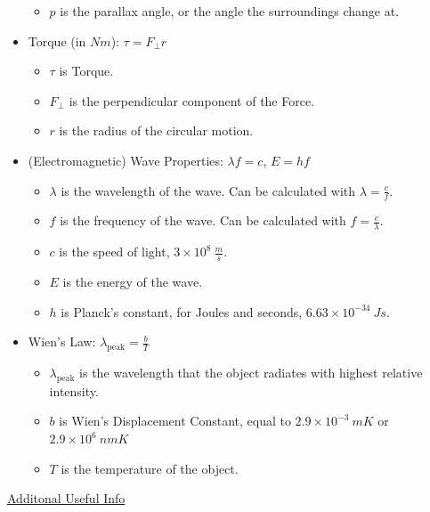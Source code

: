 \documentclass[letterpaper,14pt]{extarticle}
\begin{document}
\begin{itemize}
\begin{itemize}
        \item $p$ is the parallax angle, or the angle the surroundings change at.
    \end{itemize}
    \item Torque (in $Nm$): $\tau = F_{\perp}r$
    \begin{itemize}
        \item $\tau$ is Torque.
        \item $F_{\perp}$ is the perpendicular component of the Force.
        \item $r$ is the radius of the circular motion.
    \end{itemize}
    \item (Electromagnetic) Wave Properties: $\lambda f = c$, $E = hf$
    \begin{itemize}
        \item $\lambda$ is the wavelength of the wave. Can be calculated with $\lambda = \frac{c}{f}$.
        \item $f$ is the frequency of the wave. Can be calculated with $f = \frac{c}{\lambda}$.
        \item $c$ is the speed of light, $3 \times 10^8\ \frac{m}{s}$.
        \item $E$ is the energy of the wave.
        \item $h$ is Planck's constant, for Joules and seconds, $6.63 \times 10^{-34}\ Js$.
    \end{itemize}
    \item Wien's Law: $\lambda_{\text{peak}} = \frac{b}{T}$
    \begin{itemize}
        \item $\lambda_{\text{peak}}$ is the wavelength that the object radiates with highest relative intensity.
        \item $b$ is Wien's Displacement Constant, equal to $2.9 \times 10^{-3}\ mK$ or $2.9 \times 10^6\ nmK$
        \item $T$ is the temperature of the object.
    \end{itemize}
\end{itemize}
\pagebreak
\underline{Additonal Useful Info}
\end{document}
